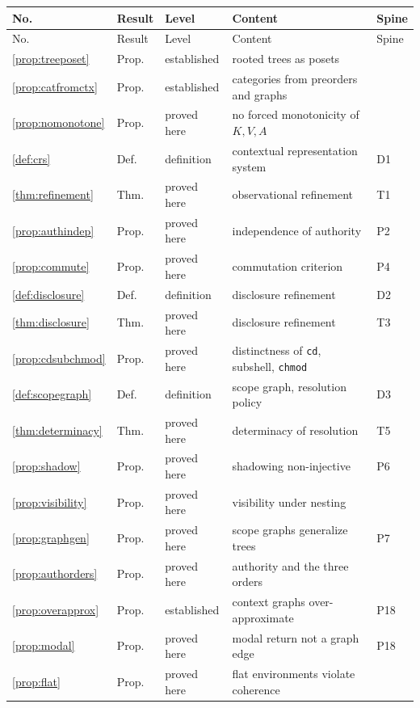 \begin{center}
\small
\begin{longtable}{lllp{5.3cm}l}
\toprule
No. & Result & Level & Content & Spine\\
\midrule
\endfirsthead
\toprule
No. & Result & Level & Content & Spine\\
\midrule
\endhead
\ref{prop:treeposet} & Prop. & established & rooted trees as posets & \\
\ref{prop:catfromctx} & Prop. & established & categories from preorders and graphs & \\
\ref{prop:nomonotone} & Prop. & proved here & no forced monotonicity of $K,V,A$ & \\
\ref{def:crs} & Def. & definition & contextual representation system & D1\\
\ref{thm:refinement} & Thm. & proved here & observational refinement & T1\\
\ref{prop:authindep} & Prop. & proved here & independence of authority & P2\\
\ref{prop:commute} & Prop. & proved here & commutation criterion & P4\\
\ref{def:disclosure} & Def. & definition & disclosure refinement & D2\\
\ref{thm:disclosure} & Thm. & proved here & disclosure refinement & T3\\
\ref{prop:cdsubchmod} & Prop. & proved here & distinctness of \texttt{cd}, subshell, \texttt{chmod} & \\
\ref{def:scopegraph} & Def. & definition & scope graph, resolution policy & D3\\
\ref{thm:determinacy} & Thm. & proved here & determinacy of resolution & T5\\
\ref{prop:shadow} & Prop. & proved here & shadowing non-injective & P6\\
\ref{prop:visibility} & Prop. & proved here & visibility under nesting & \\
\ref{prop:graphgen} & Prop. & proved here & scope graphs generalize trees & P7\\
\ref{prop:authorders} & Prop. & proved here & authority and the three orders & \\
\ref{prop:overapprox} & Prop. & established & context graphs over-approximate & P18\\
\ref{prop:modal} & Prop. & proved here & modal return not a graph edge & P18\\
\ref{prop:flat} & Prop. & proved here & flat environments violate coherence & \\

\end{longtable}
\end{center}
